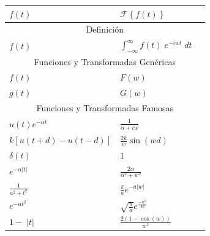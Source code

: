 \documentclass[12pt, fleqn]{report}                             %
\newcommand{\Wrap}[1]{\left( #1 \right)}                        %
\newcommand{\Cos}[1]{\cos\Wrap{#1}}                             %
\newcommand{\Sin}[1]{\sin\Wrap{#1}}                             %
\newcommand{\FourierT}[1]{\mathscr{F} \left\{ #1 \right\} }     %
\begin{document}
            \begin{table}[ht]
                \begin{tabular}{|m{16em}|m{16em}|@{}m{0pt}@{}}
                    \hline
                    \large{$f(t)$}          & \large{$\FourierT{f(t)}$}                 &\\[2em]      \hline\hline

                    \multicolumn{3}{|c|}{Definición}                                     \\           \hline
                    $f(t)$ &        $\int_{-\infty}^\infty f(t) \; e^{-iwt} \; dt$      &\\[1em]      \hline\hline
                    
                    \multicolumn{3}{|c|}{Funciones y Transformadas Genéricas}           \\            \hline
                    $f(t)$                  & $F(w)$                                    &\\[1em]      \hline
                    $g(t)$                  & $G(w)$                                    &\\[1em]      \hline\hline

                    \multicolumn{3}{|c|}{Funciones y Transformadas Famosas}             \\            \hline
                    $u(t)e^{-\alpha t}$     & $\frac{1}{\alpha + iw}                    $ &\\[1em]    \hline
                    $k[u(t+d) -u(t-d)]$     & $\frac{2k}{w} \Sin{wd}                    $ &\\[1em]    \hline
                    $\delta(t)        $     & $1                                        $ &\\[1em]    \hline
                    $e^{-\alpha|t|}   $     & $\frac{2\alpha}{\alpha^2+w^2}             $ &\\[1em]    \hline
                    $\frac{1}{a^2+t^2}$     & $\frac{\pi}{a} e^{-a |w|}                 $ &\\[1em]    \hline
                    $e^{-\alpha t^2}  $     & $\sqrt{\frac{\pi}{a}} e^{\frac{-w^2}{4a}} $ &\\[1em]    \hline
                    $1 - \; |t|       $     & $\frac{2(1 - \Cos{w})}{w^2}               $ &\\[1em]    \hline\hline
                    

\end{tabular}
\end{table}
\end{document}
